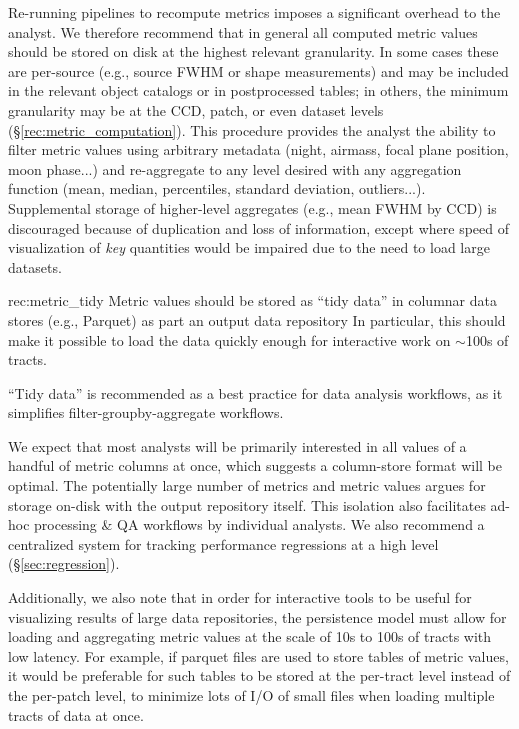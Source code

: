 Re-running pipelines to recompute metrics imposes a significant overhead to the analyst.
We therefore recommend that in general all computed metric values should be stored on disk at the highest relevant granularity.
In some cases these are per-source (e.g., source FWHM or shape measurements) and may be included in the relevant object catalogs or in postprocessed tables; in others, the minimum granularity may be at the CCD, patch, or even dataset levels (\S \ref{rec:metric_computation}).
This procedure provides the analyst the ability to filter metric values using arbitrary metadata (night, airmass, focal plane position, moon phase...) and re-aggregate to any level desired with any aggregation function (mean, median, percentiles, standard deviation, outliers...).
Supplemental storage of higher-level aggregates (e.g., mean FWHM by CCD) is discouraged because of duplication and loss of information, except where speed of visualization of \emph{key} quantities would be impaired due to the need to load large datasets.


\begin{recommendation}
    {rec:metric_tidy}
    {Metric values should be stored as ``tidy data'' in columnar data stores (e.g., Parquet) as part an output data repository}
In particular, this should make it possible to load the data quickly enough for interactive work on $\sim$100s of tracts.
\end{recommendation}

``Tidy data'' \citep{JSSv059i10} is recommended as a best practice for data analysis workflows, as it simplifies filter-groupby-aggregate workflows.

We expect that most analysts will be primarily interested in all values of a handful of metric columns at once, which suggests a column-store format will be optimal.
The potentially large number of metrics and metric values argues for storage on-disk with the output repository itself.
This isolation also facilitates ad-hoc processing \& QA workflows by individual analysts.
We also recommend a centralized system for tracking performance regressions at a high level (\S \ref{sec:regression}).

Additionally, we also note that in order for interactive tools to be useful for visualizing results of large data repositories, the persistence model must allow for loading and aggregating metric values at the scale of 10s to 100s of tracts with low latency.
For example, if parquet files are used to store tables of metric values, it would be preferable for such tables to be stored at the per-tract level instead of the per-patch level, to minimize lots of I/O of small files when loading multiple tracts of data at once.


